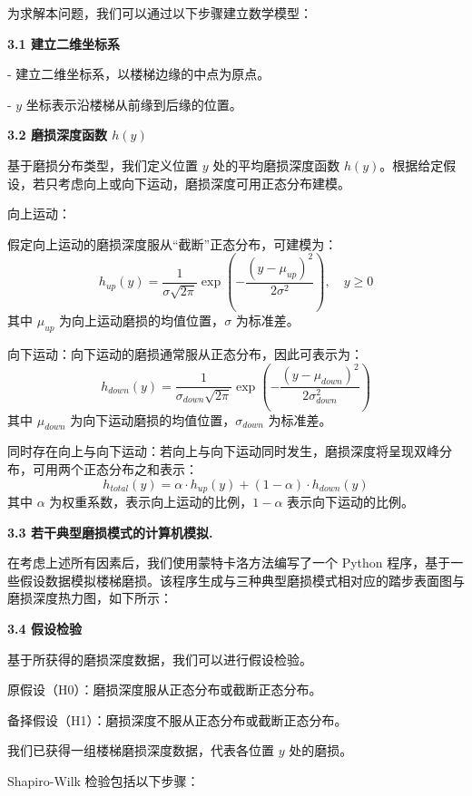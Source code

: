 \documentclass[11pt,a4paper]{ctexart}
\newcommand{\runin}[1]{\par\noindent\textbf{#1}\par\nobreak}
\begin{document}
为求解本问题，我们可以通过以下步骤建立数学模型：

\runin{3.1 建立二维坐标系}

- 建立二维坐标系，以楼梯边缘的中点为原点。

- $y$ 坐标表示沿楼梯从前缘到后缘的位置。

\runin{3.2 磨损深度函数 $h(y)$}

基于磨损分布类型，我们定义位置 $y$ 处的平均磨损深度函数 $h(y)$。根据给定假设，若只考虑向上或向下运动，磨损深度可用正态分布建模。

向上运动：

假定向上运动的磨损深度服从“截断”正态分布，可建模为：
\begin{equation}
h_{up}(y)=\frac{1}{\sigma\sqrt{2\pi}}\exp\left(-\frac{(y-\mu_{up})^2}{2\sigma^2}\right),\quad y\ge 0 \tag{14}
\end{equation}
其中 $\mu_{up}$ 为向上运动磨损的均值位置，$\sigma$ 为标准差。

向下运动：向下运动的磨损通常服从正态分布，因此可表示为：
\begin{equation}
h_{down}(y)=\frac{1}{\sigma_{down}\sqrt{2\pi}}\exp\left(-\frac{(y-\mu_{down})^2}{2\sigma_{down}^2}\right) \tag{15}
\end{equation}
其中 $\mu_{down}$ 为向下运动磨损的均值位置，$\sigma_{down}$ 为标准差。

同时存在向上与向下运动：若向上与向下运动同时发生，磨损深度将呈现双峰分布，可用两个正态分布之和表示：
\begin{equation}
h_{total}(y)=\alpha\cdot h_{up}(y)+(1-\alpha)\cdot h_{down}(y) \tag{16}
\end{equation}
其中 $\alpha$ 为权重系数，表示向上运动的比例，$1-\alpha$ 表示向下运动的比例。

\runin{3.3 若干典型磨损模式的计算机模拟.}

在考虑上述所有因素后，我们使用蒙特卡洛方法编写了一个 Python 程序，基于一些假设数据模拟楼梯磨损。该程序生成与三种典型磨损模式相对应的踏步表面图与磨损深度热力图，如下所示：

\runin{3.4 假设检验}

基于所获得的磨损深度数据，我们可以进行假设检验。

原假设（H0）：磨损深度服从正态分布或截断正态分布。

备择假设（H1）：磨损深度不服从正态分布或截断正态分布。

我们已获得一组楼梯磨损深度数据，代表各位置 $y$ 处的磨损。

Shapiro-Wilk 检验包括以下步骤：
\end{document}
